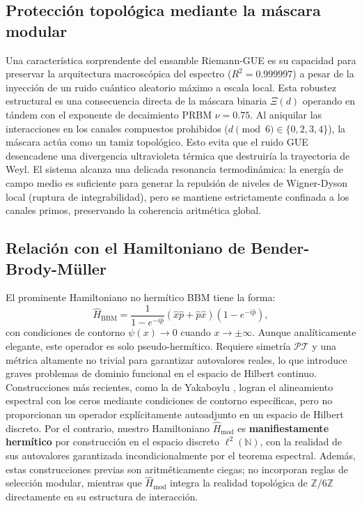 \documentclass[aps,prl,preprint,superscriptaddress,floatfix]{revtex4-2}
\newcommand{\Zmod}{\mathbb{Z}/6\mathbb{Z}}
\begin{document}
\subsection{Protección topológica mediante la máscara modular}

Una característica sorprendente del ensamble Riemann-GUE es su capacidad para preservar la arquitectura macroscópica del espectro ($R^2 = 0.999997$) a pesar de la inyección de un ruido cuántico aleatorio máximo a escala local. Esta robustez estructural es una consecuencia directa de la máscara binaria $\Xi(d)$ operando en tándem con el exponente de decaimiento PRBM $\nu = 0.75$. Al aniquilar las interacciones en los canales compuestos prohibidos ($d \pmod 6 \in \{0, 2, 3, 4\}$), la máscara actúa como un tamiz topológico. Esto evita que el ruido GUE desencadene una divergencia ultravioleta térmica que destruiría la trayectoria de Weyl. El sistema alcanza una delicada resonancia termodinámica: la energía de campo medio es suficiente para generar la repulsión de niveles de Wigner-Dyson local (ruptura de integrabilidad), pero se mantiene estrictamente confinada a los canales primos, preservando la coherencia aritmética global.

\subsection{Relación con el Hamiltoniano de Bender-Brody-Müller}

El prominente Hamiltoniano no hermítico BBM \cite{Bender2017} tiene la forma:
\begin{equation}
\hat{H}_{\text{BBM}} = \frac{1}{1 - e^{-i\hat{p}}} (\hat{x}\hat{p} + \hat{p}\hat{x}) (1 - e^{-i\hat{p}}),
\end{equation}
con condiciones de contorno $\psi(x) \to 0$ cuando $x \to \pm\infty$. Aunque analíticamente elegante, este operador es solo pseudo-hermítico. Requiere simetría $\mathcal{PT}$ y una métrica altamente no trivial para garantizar autovalores reales, lo que introduce graves problemas de dominio funcional en el espacio de Hilbert continuo. Construcciones más recientes, como la de Yakaboylu \cite{Yakaboylu2024}, logran el alineamiento espectral con los ceros mediante condiciones de contorno específicas, pero no proporcionan un operador explícitamente autoadjunto en un espacio de Hilbert discreto. Por el contrario, nuestro Hamiltoniano $\hat{H}_{\text{mod}}$ es \textbf{manifiestamente hermítico} por construcción en el espacio discreto $\ell^2(\mathbb{N})$, con la realidad de sus autovalores garantizada incondicionalmente por el teorema espectral. Además, estas construcciones previas son aritméticamente ciegas; no incorporan reglas de selección modular, mientras que $\hat{H}_{\text{mod}}$ integra la realidad topológica de $\Zmod$ directamente en su estructura de interacción.
\end{document}
